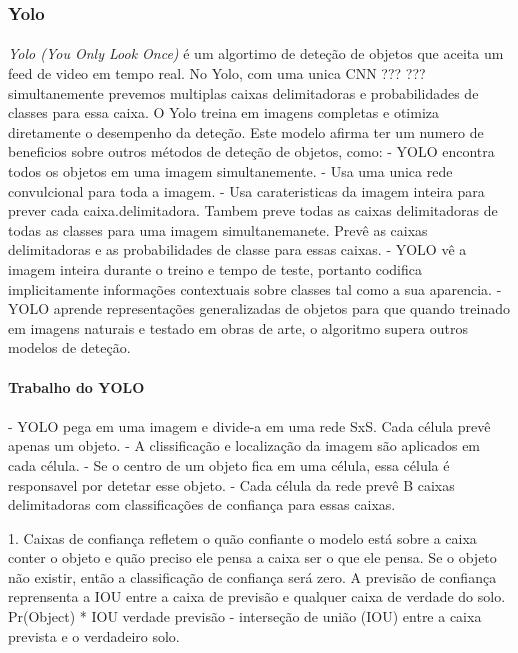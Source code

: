 \subsubsection{Yolo}
\paragraph{}
\textit{Yolo (You Only Look Once)} é um algortimo de deteção de objetos que aceita um feed de video em tempo real.
No Yolo, com uma unica CNN ??? ??? simultanemente prevemos multiplas caixas delimitadoras e probabilidades de classes para essa caixa. O Yolo treina em imagens completas e otimiza diretamente o desempenho da deteção. Este modelo afirma ter um numero de beneficios sobre outros métodos de deteção de objetos, como:
\newline - YOLO encontra todos os objetos em uma imagem simultanemente.
\newline - Usa uma unica rede convulcional para toda a imagem.
\newline - Usa carateristicas da imagem inteira para prever cada caixa.delimitadora. Tambem preve todas as caixas delimitadoras de todas as classes para uma imagem simultanemanete. Prevê as caixas delimitadoras e as probabilidades de classe para essas caixas.
\newline - YOLO vê a imagem inteira durante o treino e tempo de teste, portanto codifica implicitamente informações contextuais sobre classes tal como a sua aparencia.
\newline - YOLO aprende representações generalizadas de objetos para que quando treinado em imagens naturais e testado em obras de arte, o algoritmo supera outros modelos de deteção.

\paragraph{Trabalho do YOLO}
\paragraph{}

- YOLO pega em uma imagem e divide-a em uma rede SxS. Cada célula prevê apenas um objeto.
- A clissificação e localização da imagem são aplicados em cada célula.
- Se o centro de um objeto fica em uma célula, essa célula é responsavel por detetar esse objeto.
- Cada célula da rede prevê B caixas delimitadoras com classificações de confiança para essas caixas.

1. Caixas de confiança refletem o quão confiante o modelo está sobre a caixa conter o objeto e quão preciso ele pensa a caixa ser o que ele pensa. Se o objeto não existir, então a classificação de confiança será zero. 
\newline
A previsão de confiança reprensenta a IOU entre a caixa de previsão e qualquer caixa de verdade do solo.
Pr(Object) * IOU verdade previsão - interseção de união (IOU) entre a caixa prevista e o verdadeiro solo.


